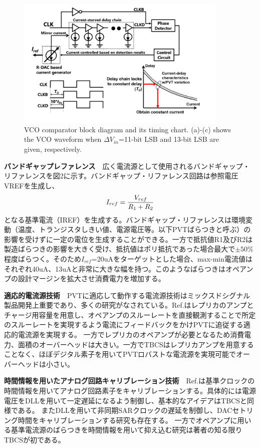\documentclass[letterpaper, 10 pt, conference]{ieeeconf}  %
\begin{document}
\begin{figure}[!]
\centering
 \includegraphics[width=0.9\textwidth]{figs/fig2.png}
  \caption{VCO comparator block diagram and its timing chart. (a)-(c) shows the VCO waveform when $\Delta V_{in}$=11-bit LSB and 13-bit LSB are given, respectively.}
  \label{fig2}
\end{figure}
\textbf{バンドギャップレファレンス}　広く電流源として使用されるバンドギャップ・リファレンスを図2に示す。バンドギャップ・リファレンス回路は参照電圧VREFを生成し、
\begin{eqnarray}
    \centering
    I_{ref} = \frac{V_{ref}}{R_1 + R_2}
    \label{sar13b}
\end{eqnarray}
となる基準電流（IREF）を生成する。バンドギャップ・リファレンスは環境変動（温度、トランジスタしきい値、電源電圧等。以下PVTばらつきと呼ぶ）の影響を受けずに一定の電位を生成することができる。一方で抵抗値R1及びR2は製造ばらつきの影響を大きく受け、抵抗値はポリ抵抗であった場合最大で$\pm 50\%$程度ばらつく。そのため$I_{ref}$=20uAをターゲットとした場合、max-min電流値はそれぞれ40uA、13uAと非常に大きな幅を持つ。このようなばらつきはオペアンプの設計マージンを拡大させ消費電力を増加する。

\textbf{適応的電流源技術}　PVTに適応して動作する電流源技術はミックスドシグナル製品開発上重要であり、多くの研究がなされている。Ref.\cite{chuanyang,ron}はレプリカのアンプとチャージ用容量を用意し、オペアンプのスルーレートを直接観測することで所定のスルーレートを実現するよう電流にフィードバックをかけPVTに追従する適応的電流源を実現する。
一方でレプリカのオペアンプが必要となるため消費電力、面積のオーバーヘッドは大きい。一方でTBCSはレプリカアンプを用意することなく、ほぼデジタル素子を用いてPVTロバストな電流源を実現可能でオーバーヘッドは小さい。

\textbf{時間情報を用いたアナログ回路キャリブレーション技術}　Ref.\cite{zhu}は基準クロックの時間情報を用いてアナログ回路素子をキャリブレーションする。具体的には電源電圧をDLLを用いて一定遅延になるよう制御し、基本的なアイデアはTBCSと同様である。
またDLLを用いて非同期SARクロックの遅延を制御し、DACセトリング時間をキャリブレーションする研究も存在する\cite{kapusta201314b,tompson}。
一方でオペアンプに用いる基準電流源のばらつきを時間情報を用いて抑え込む研究は著者の知る限りTBCSが初である。
\end{document}
